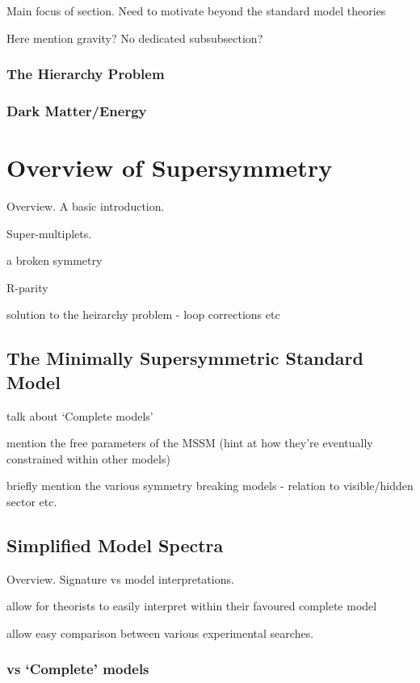 Main focus of section. Need to motivate beyond the standard model theories

Here mention gravity? No dedicated subsubsection?

\subsubsection{The Hierarchy Problem}
\subsubsection{Dark Matter/Energy}


\section{Overview of Supersymmetry}  %
\label{sec:theory_overview}
Overview. A basic introduction.

Super-multiplets.

a broken symmetry

R-parity

solution to the heirarchy problem - loop corrections etc

\subsection{The Minimally Supersymmetric Standard Model}
talk about `Complete models'

mention the free parameters of the MSSM (hint at how they're eventually 
constrained within other models)

briefly mention the various symmetry breaking models - relation to visible/hidden sector 
etc.


\subsection{Simplified Model Spectra}
Overview. Signature vs model interpretations.

allow for theorists to easily interpret within their favoured complete model

allow easy comparison between various experimental searches.

\subsubsection{vs `Complete' models}

